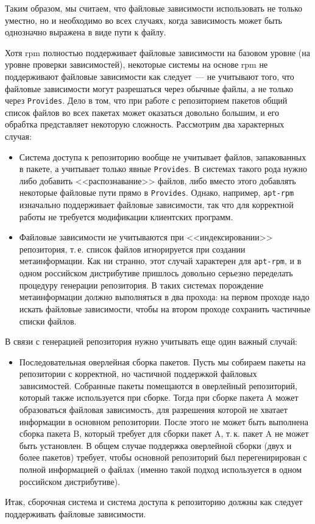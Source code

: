 \documentclass[russian,a4paper,12pt,titlepage]{article}
\begin{document}
Таким образом, мы считаем, что файловые зависимости использовать не только уместно, но и необходимо во всех случаях,
когда зависимость может быть однозначно выражена в виде пути к файлу.

Хотя rpm полностью поддерживает файловые зависимости на базовом уровне (на уровне проверки зависимостей),
некоторые системы на основе rpm не поддерживают файловые зависимости как следует~--- не учитывают того,
что файловые зависимости могут разрешаться через обычные файлы, а не только через \verb|Provides|.
Дело в том, что при работе с репозиторием пакетов общий список файлов во всех пакетах может оказаться
довольно большим, и его обрабтка представляет некоторую сложность.  Рассмотрим два характерных случая:
\begin{itemize}
\item Система доступа к репозиторию вообще не учитывает файлов, запакованных в пакете, а учитывает только явные \verb|Provides|.
В системах такого рода нужно либо добавить <<распознавание>> файлов, либо вместо этого добавлять некоторые файловые пути прямо
в \verb|Provides|.  Однако, например, \verb|apt-rpm| изначально поддерживает файловые зависимости, так что для корректной работы
не требуется модификации клиентских программ.
\item Файловые зависимости не учитываются при <<индексировании>> репозитория, т.\,е. список файлов игнорируется при создании
метаинформации.  Как ни странно, этот случай характерен для \verb|apt-rpm|, и в одном российском дистрибутиве пришлось довольно
серьезно переделать процедуру генерации репозитория.  В таких системах порождение метаинформации должно выполняться в два
прохода: на первом проходе надо искать файловые зависимости, чтобы на втором проходе сохранить частичные списки файлов.
\end{itemize}
В связи с генерацией репозитория нужно учитывать еще один важный случай:
\begin{itemize}
\item Последовательная оверлейная сборка пакетов.  Пусть мы собираем пакеты на репозитории с корректной, но частичной
поддержкой файловых зависимостей.  Собранные пакеты помещаются в оверлейный репозиторий, который также используется
при сборке.  Тогда при сборке пакета A может образоваться файловая зависимость, для разрешения которой не хватает информации
в основном репозитории.  После этого не может быть выполнена сборка пакета B, который требует для сборки пакет A,
т.\,к. пакет A не может быть установлен.  В общем случае поддержка оверлейной сборки (двух и более пакетов) требует,
чтобы основной репозиторий был перегенирирован с полной информацией о файлах (именно такой подход используется в одном
российском дистрибутиве).
\end{itemize}
Итак, сборочная система и система доступа к репозиторию должны как следует поддерживать файловые зависимости.
\end{document}
